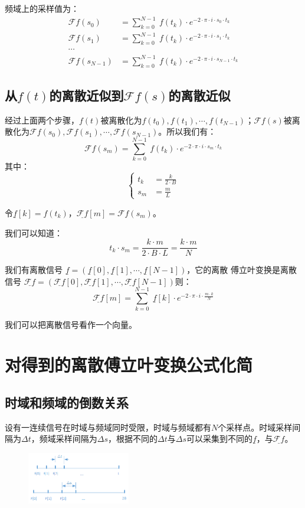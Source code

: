 频域上的采样值为：
\begin{align*}
	\mathcal{F}f(s_0)     & =\sum\limits_{k=0}^{N-1}\ f(t_k)\cdot e^{-2\cdot \pi\cdot i\cdot s_0\cdot t_k}     \\
	\mathcal{F}f(s_1)     & =\sum\limits_{k=0}^{N-1}\ f(t_k)\cdot e^{-2\cdot \pi\cdot i\cdot s_1\cdot t_k}     \\
	\cdots                                                                                                     \\
	\mathcal{F}f(s_{N-1}) & =\sum\limits_{k=0}^{N-1}\ f(t_k)\cdot e^{-2\cdot \pi\cdot i\cdot s_{N-1}\cdot t_k}
\end{align*}
\subsection{从$f(t)$的离散近似到$\mathcal{F}f(s)$的离散近似}
经过上面两个步骤，$f(t)$被离散化为$f(t_0),f(t_1),\cdots,f(t_{N-1})$；$\mathcal{F}f(s)$被离散化为$\mathcal{F}f(s_0),\mathcal{F}f(s_1),\cdots,\mathcal{F}f(s_{N-1})$。所以我们有：
$$
	\mathcal{F}f(s_m)=\sum\limits_{k=0}^{N-1}\ f(t_k)\cdot e^{-2\cdot \pi\cdot i\cdot s_m\cdot t_k}
$$
其中：
$$
	\begin{cases}
		t_k & = \frac{k}{2\cdot B} \\
		s_m & = \frac{m}{L}
	\end{cases}
$$

令$\underline{f}[k]=f(t_k)$，$\underline{\mathcal{F}f}[m]=\mathcal{F}f(s_m)$。

我们可以知道：
$$
	t_k\cdot s_m=\frac{k\cdot m}{2\cdot B\cdot L}=\frac{k\cdot m}{N}
$$

我们有离散信号 $\underline{f}=(\underline{f}[0],\underline{f}[1],\cdots,\underline{f}[N-1])$，它的离散 傅立叶变换是离散信号 $\underline{\mathcal{F}f}=(\underline{\mathcal{F}f}[0],\underline{\mathcal{F}f}[1],\cdots,\underline{\mathcal{F}f}[N-1])$则：
\begin{equation}
	\underline{\mathcal{F}f}[m]=\sum\limits_{k=0}^{N-1}\ \underline{f}[k]\cdot e^{-2\cdot \pi\cdot i\cdot \frac{m\cdot k}{N}}
\end{equation}

我们可以把离散信号看作一个向量。
\section{对得到的离散傅立叶变换公式化简}
\subsection{时域和频域的倒数关系}
设有一连续信号在时域与频域同时受限，时域与频域都有$N$个采样点。时域采样间隔为$\Delta t$，频域采样间隔为$\Delta s$，根据不同的$\Delta t$与$\Delta s$可以采集到不同的$\underline{f}$，与$\underline{\mathcal{F}f}$。
\begin{figure}[H]
	\centering
	\includegraphics[width=0.4\textwidth]{assets/DFT3.png}
\end{figure}

